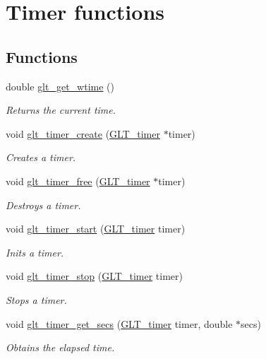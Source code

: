 \hypertarget{group__TIMER}{\section{Timer functions}
\label{group__TIMER}
}
\subsection*{Functions}
\begin{DoxyCompactItemize}
\item 
double \hyperlink{group__TIMER_ga10b6dded8a6efbfd0050a1bbb16c6093}{glt\-\_\-get\-\_\-wtime} ()
\begin{DoxyCompactList}\small\item\em Returns the current time. \end{DoxyCompactList}\item 
void \hyperlink{group__TIMER_ga1f5d36e90642bc7033e5a66aad5c3374}{glt\-\_\-timer\-\_\-create} (\hyperlink{group__OBJECTS_ga3093d7a3e24de4e022998d4f8243f309}{G\-L\-T\-\_\-timer} $\ast$timer)
\begin{DoxyCompactList}\small\item\em Creates a timer. \end{DoxyCompactList}\item 
void \hyperlink{group__TIMER_ga8148126a79bc4cc7e918ce83c072beea}{glt\-\_\-timer\-\_\-free} (\hyperlink{group__OBJECTS_ga3093d7a3e24de4e022998d4f8243f309}{G\-L\-T\-\_\-timer} $\ast$timer)
\begin{DoxyCompactList}\small\item\em Destroys a timer. \end{DoxyCompactList}\item 
void \hyperlink{group__TIMER_gae6d5c5474df4136fba09a44a674f2d56}{glt\-\_\-timer\-\_\-start} (\hyperlink{group__OBJECTS_ga3093d7a3e24de4e022998d4f8243f309}{G\-L\-T\-\_\-timer} timer)
\begin{DoxyCompactList}\small\item\em Inits a timer. \end{DoxyCompactList}\item 
void \hyperlink{group__TIMER_ga7acf6ad2746fb5f2e4349a695832cd4f}{glt\-\_\-timer\-\_\-stop} (\hyperlink{group__OBJECTS_ga3093d7a3e24de4e022998d4f8243f309}{G\-L\-T\-\_\-timer} timer)
\begin{DoxyCompactList}\small\item\em Stops a timer. \end{DoxyCompactList}\item 
void \hyperlink{group__TIMER_ga20c93b3e3ab51544bbf32116f04ab85a}{glt\-\_\-timer\-\_\-get\-\_\-secs} (\hyperlink{group__OBJECTS_ga3093d7a3e24de4e022998d4f8243f309}{G\-L\-T\-\_\-timer} timer, double $\ast$secs)
\begin{DoxyCompactList}\small\item\em Obtains the elapsed time. \end{DoxyCompactList}\end{DoxyCompactItemize}



